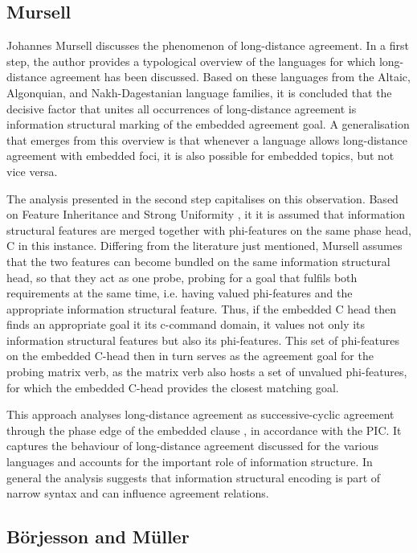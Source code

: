 \documentclass[output=paper
,modfonts
,nonflat]{langsci/langscibook}
\begin{document}
\subsection{Mursell}
\label{sec:mursell}

Johannes Mursell discusses the phenomenon of long-distance agreement. In a first step, the author provides a typological overview of the languages for which long-distance agreement has been discussed. Based on these languages from the Altaic, Algonquian, and Nakh-Dagestanian language families, it is concluded that the decisive factor that unites all occurrences of long-distance agreement is information structural marking of the embedded agreement goal. A generalisation that emerges from this overview is that whenever a language allows long-distance agreement with embedded foci, it is also possible for embedded topics, but not vice versa.

The analysis presented in the second step capitalises on this observation. Based on Feature Inheritance \citep{Chomsky2008} and Strong Uniformity \citep{Miyagawa2010,Miyagawa2017}, it it is assumed that information structural features are merged together with phi-features on the same phase head, C in this instance. Differing from the literature just mentioned, Mursell assumes that the two features can become bundled on the same information structural head, so that they act as one probe, probing for a goal that fulfils both requirements at the same time, i.e. having valued phi-features and the appropriate information structural feature. Thus, if the embedded C head then finds an appropriate goal it its c-command domain, it values not only its information structural features but also its phi-features. This set of phi-features on the embedded C-head then in turn serves as the agreement goal for the probing matrix verb, as the matrix verb also hosts a set of unvalued phi-features, for which the embedded C-head provides the closest matching goal.

This approach analyses long-distance agreement as successive-cyclic agreement through the phase edge of the embedded clause \citep{Legate2005}, in accordance with the PIC. It captures the behaviour of long-distance agreement discussed for the various languages and accounts for the important role of information structure. In general the analysis suggests that information structural encoding is part of narrow syntax and can influence agreement relations.

\subsection{B\"{o}rjesson and M\"{u}ller}
\label{sec:boerjessonmueller}
\end{document}
